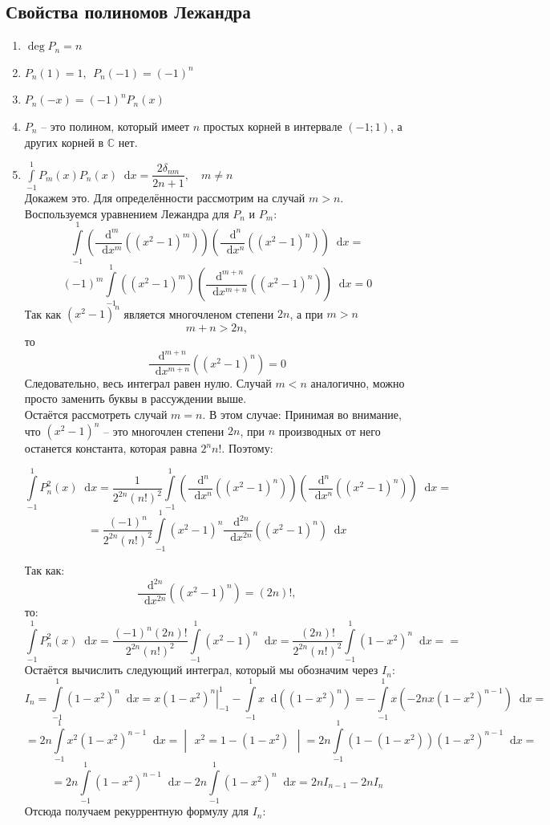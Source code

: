 \documentclass[11pt,a4paper]{report}
\numberwithin{equation}{section}
\numberwithin{figure}{chapter}
\numberwithin{table}{chapter}
\newcommand{\C}{\mathbb{C}}
\newcommand{\dd}{\mathop{}\!\mathrm{d}}
\newcommand{\skobka}[1]{\left( #1 \right)}
\begin{document}
\subsection{Свойства полиномов Лежандра}
\begin{enumerate}
    \item $\deg P_n = n$
    \item $P_n(1)=1, \ \ P_n(-1)=(-1)^n$
    \item $P_n(-x)=(-1)^nP_n(x)$
    \item $P_n$ -- это полином, который имеет $n$ простых корней в интервале $(-1;1) $, а других корней в $\C$ нет.
    \item $\int\limits_{-1}^{1} P_m(x)P_n(x)\dd x = \dfrac{2\delta_{nm}}{2n+1}, \quad m\neq n$\\ Докажем это.
    Для определённости рассмотрим на случай $m>n$. Воспользуемся уравнением Лежандра для $P_n$ и $P_m$:
\[
\int\limits_{-1}^{1}
\skobka{\dfrac{\dd^m}{\dd x^m}\skobka{(x^2-1)^m}}
\skobka{\dfrac{\dd^n}{\dd x^n}\skobka{(x^2-1)^n}}
\dd x
=\]\[
(-1)^m
\int\limits_{-1}^{1}
\skobka{(x^2-1)^m}
\skobka{
\dfrac{\dd^{m+n}}{\dd x^{m+n}}\skobka{(x^2-1)^n}
}
\dd x
=0
\]
Так как \((x^2-1)^n\) является многочленом степени \(2n\), а при \(m>n\)
\[
m+n>2n,
\]
то
\[
\dfrac{\dd^{m+n}}{\dd x^{m+n}}\skobka{(x^2-1)^n}=0
\]
Следовательно, весь интеграл равен нулю. Случай $m<n$ аналогично, можно просто заменить буквы в рассуждении выше.\\
Остаётся рассмотреть случай $m=n$. В этом случае:
Принимая во внимание, что \((x^2-1)^n\) -- это многочлен степени \(2n\), при \(n\) производных от него останется константа, которая равна \(2^nn!\). Поэтому:

\[
\int\limits_{-1}^{1} P_n^2(x)\dd x
=
\dfrac{1}{2^{2n}(n!)^2}
\int\limits_{-1}^{1}
\skobka{
\dfrac{\dd^n}{\dd x^n}\skobka{(x^2-1)^n}
}
\skobka{
\dfrac{\dd^n}{\dd x^n}\skobka{(x^2-1)^n}
}
\dd x=\]
\[=
\dfrac{(-1)^n}{2^{2n}(n!)^2}
\int\limits_{-1}^{1}
(x^2-1)^n
\dfrac{\dd^{2n}}{\dd x^{2n}}\skobka{(x^2-1)^n}
\dd x
\]

Так как:
\[
\dfrac{\dd^{2n}}{\dd x^{2n}}\skobka{(x^2-1)^n}=(2n)!,
\]
то:
\[
\int\limits_{-1}^{1} P_n^2(x)\dd x
=
\dfrac{(-1)^n(2n)!}{2^{2n}(n!)^2}
\int\limits_{-1}^{1}
(x^2-1)^n
\dd x
=
\dfrac{(2n)!}{2^{2n}(n!)^2}
\int\limits_{-1}^{1}
(1-x^2)^n
\dd x =\boxed{=}
\]
Остаётся вычислить следующий интеграл, который мы обозначим через \(I_n\):
\[
I_n
=
\int\limits_{-1}^{1}(1-x^2)^n\dd x=
\left. x(1-x^2)^n \right|_{-1}^{1}-\int\limits_{-1}^{1}x\dd\skobka{(1-x^2)^n}
=
-\int\limits_{-1}^{1}
x\skobka{-2nx(1-x^2)^{n-1}}\dd x
=\]
\[=2n\int\limits_{-1}^{1}
x^2(1-x^2)^{n-1}\dd x=\begin{vmatrix}
x^2=1-(1-x^2)
\end{vmatrix}=
2n\int\limits_{-1}^{1}
\skobka{1-(1-x^2)}(1-x^2)^{n-1}\dd x=\]\[=
2n\int\limits_{-1}^{1}
(1-x^2)^{n-1}\dd x
-
2n\int\limits_{-1}^{1}
(1-x^2)^n\dd x
=
2nI_{n-1}-2nI_n
\]
Отсюда получаем рекуррентную формулу для \(I_n\):


\end{enumerate}
\end{document}
